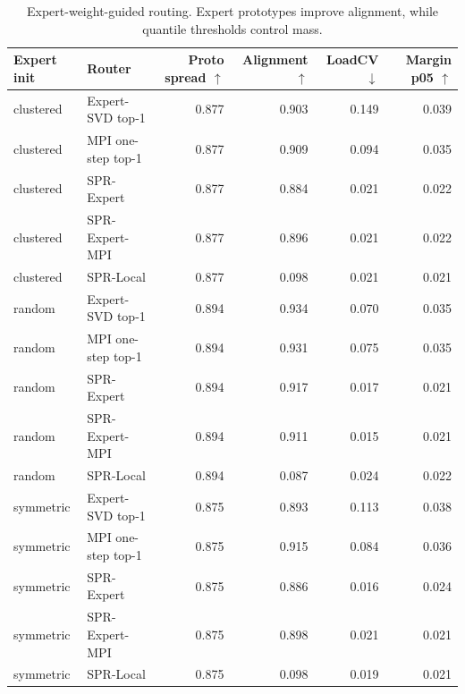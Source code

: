 \begin{table}[t]
\centering
\caption{Expert-weight-guided routing. Expert prototypes improve alignment, while quantile thresholds control mass.}
\label{tab:e3_expert_guided}
\begin{tabular}{llrrrr}
\toprule
Expert init & Router & Proto spread $\uparrow$ & Alignment $\uparrow$ & LoadCV $\downarrow$ & Margin p05 $\uparrow$ \\
\midrule
clustered & Expert-SVD top-1 & 0.877 & 0.903 & 0.149 & 0.039 \\
clustered & MPI one-step top-1 & 0.877 & 0.909 & 0.094 & 0.035 \\
clustered & SPR-Expert & 0.877 & 0.884 & 0.021 & 0.022 \\
clustered & SPR-Expert-MPI & 0.877 & 0.896 & 0.021 & 0.022 \\
clustered & SPR-Local & 0.877 & 0.098 & 0.021 & 0.021 \\
random & Expert-SVD top-1 & 0.894 & 0.934 & 0.070 & 0.035 \\
random & MPI one-step top-1 & 0.894 & 0.931 & 0.075 & 0.035 \\
random & SPR-Expert & 0.894 & 0.917 & 0.017 & 0.021 \\
random & SPR-Expert-MPI & 0.894 & 0.911 & 0.015 & 0.021 \\
random & SPR-Local & 0.894 & 0.087 & 0.024 & 0.022 \\
symmetric & Expert-SVD top-1 & 0.875 & 0.893 & 0.113 & 0.038 \\
symmetric & MPI one-step top-1 & 0.875 & 0.915 & 0.084 & 0.036 \\
symmetric & SPR-Expert & 0.875 & 0.886 & 0.016 & 0.024 \\
symmetric & SPR-Expert-MPI & 0.875 & 0.898 & 0.021 & 0.021 \\
symmetric & SPR-Local & 0.875 & 0.098 & 0.019 & 0.021 \\
\bottomrule
\end{tabular}
\end{table}
